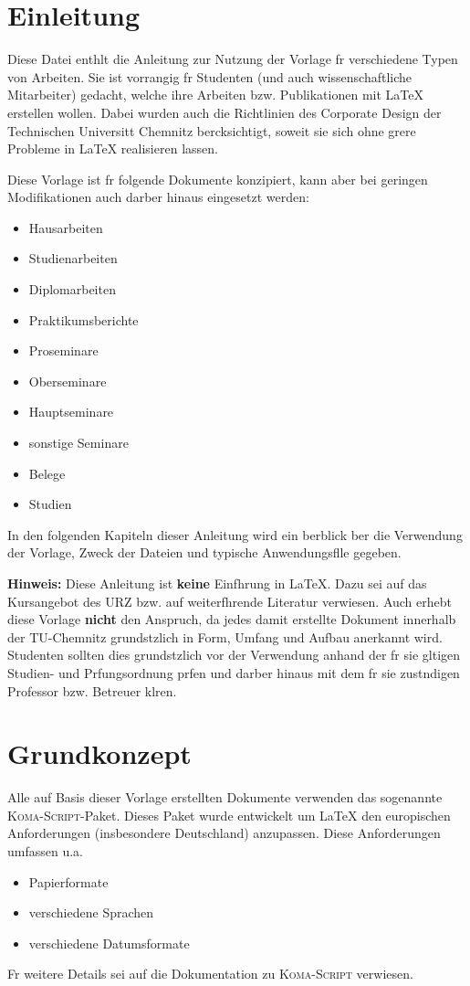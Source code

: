 

\section{Einleitung}
Diese Datei enthlt die Anleitung zur Nutzung der Vorlage fr verschiedene
Typen von Arbeiten. Sie ist vorrangig fr Studenten (und auch wissenschaftliche
Mitarbeiter) gedacht, welche ihre Arbeiten bzw. Publikationen mit \LaTeX{}
erstellen wollen. Dabei wurden auch die Richtlinien des Corporate Design
der Technischen Universitt Chemnitz bercksichtigt, soweit sie sich
ohne grere Probleme in \LaTeX{} realisieren lassen.

Diese Vorlage ist fr folgende Dokumente konzipiert, kann aber bei geringen
Modifikationen auch darber hinaus eingesetzt werden:
\begin{itemize}
\item Hausarbeiten
\item Studienarbeiten
\item Diplomarbeiten
\item Praktikumsberichte
\item Proseminare
\item Oberseminare
\item Hauptseminare
\item sonstige Seminare
\item Belege
\item Studien
\end{itemize}

In den folgenden Kapiteln dieser Anleitung wird ein berblick ber die
Verwendung der Vorlage, Zweck der Dateien und typische Anwendungsflle
gegeben.

\textbf{Hinweis:} Diese Anleitung ist \textbf{keine} Einfhrung
in \LaTeX. Dazu sei auf das Kursangebot des URZ bzw. auf weiterfhrende
Literatur verwiesen. Auch erhebt diese Vorlage \textbf{nicht} den Anspruch,
da jedes damit erstellte Dokument innerhalb der TU-Chemnitz grundstzlich
in Form, Umfang und Aufbau anerkannt wird. Studenten sollten dies
grundstzlich vor der Verwendung anhand der fr sie gltigen Studien-
und Prfungsordnung prfen und darber hinaus mit dem fr sie
zustndigen Professor bzw. Betreuer klren.
\section{Grundkonzept}
Alle auf Basis dieser Vorlage erstellten Dokumente verwenden das sogenannte
{\scshape Koma-Script}-Paket. Dieses Paket wurde entwickelt um \LaTeX{} den
europischen Anforderungen (insbesondere Deutschland) anzupassen.
Diese Anforderungen umfassen u.a.
\begin{itemize}
\item Papierformate
\item verschiedene Sprachen
\item verschiedene Datumsformate
\end{itemize}
Fr weitere Details sei auf die Dokumentation zu {\scshape Koma-Script}
verwiesen.
